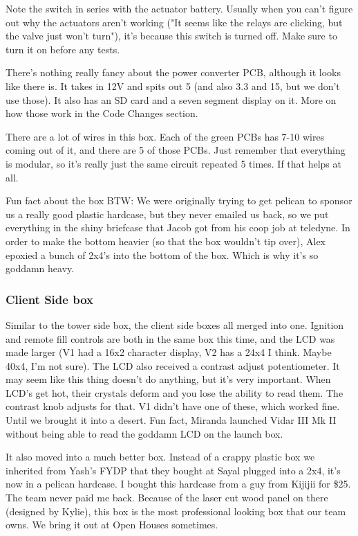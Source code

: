 \documentclass[11pt]{article}
\begin{document}
Note the switch in series with the actuator battery. Usually when you can't
figure out why the actuators aren't working ("It seems like the relays are
clicking, but the valve just won't turn"), it's because this switch is turned
off. Make sure to turn it on before any tests.

There's nothing really fancy about the power converter PCB, although it looks
like there is. It takes in 12V and spits out 5 (and also 3.3 and 15, but we
don't use those). It also has an SD card and a seven segment display on it. More
on how those work in the Code Changes section.

There are a lot of wires in this box. Each of the green PCBs has 7-10 wires
coming out of it, and there are 5 of those PCBs. Just remember that everything
is modular, so it's really just the same circuit repeated 5 times. If that helps
at all.

Fun fact about the box BTW: We were originally trying to get pelican to sponsor
us a really good plastic hardcase, but they never emailed us back, so we put
everything in the shiny briefcase that Jacob got from his coop job at
teledyne. In order to make the bottom heavier (so that the box wouldn't tip
over), Alex epoxied a bunch of 2x4's into the bottom of the box. Which is why
it's so goddamn heavy.

\subsubsection{Client Side box}
\label{sec:org3be7efb}

Similar to the tower side box, the client side boxes all merged into
one. Ignition and remote fill controls are both in the same box this time, and
the LCD was made larger (V1 had a 16x2 character display, V2 has a 24x4 I
think. Maybe 40x4, I'm not sure). The LCD also received a contrast adjust
potentiometer. It may seem like this thing doesn't do anything, but it's very
important. When LCD's get hot, their crystals deform and you lose the ability to
read them. The contrast knob adjusts for that. V1 didn't have one of these,
which worked fine. Until we brought it into a desert. Fun fact, Miranda launched
Vidar III Mk II without being able to read the goddamn LCD on the launch box.

It also moved into a much better box. Instead of a crappy plastic box we
inherited from Yash's FYDP that they bought at Sayal plugged into a 2x4, it's
now in a pelican hardcase. I bought this hardcase from a guy from Kijijii for
\$25. The team never paid me back. Because of the laser cut wood panel on there
(designed by Kylie), this box is the most professional looking box that our team
owns. We bring it out at Open Houses sometimes.
\end{document}

